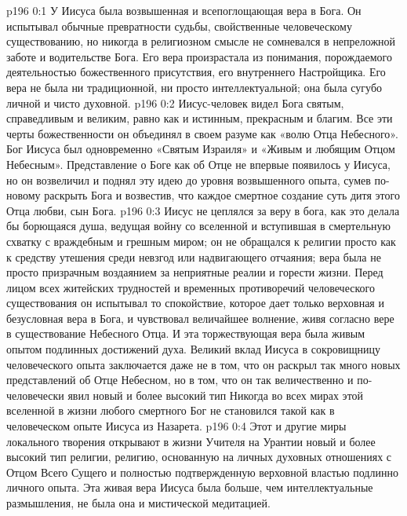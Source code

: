 \author{Комиссия срединников}
\vs p196 0:1 У Иисуса была возвышенная и всепоглощающая вера в Бога. Он испытывал обычные превратности судьбы, свойственные человеческому существованию, но никогда в религиозном смысле не сомневался в непреложной заботе и водительстве Бога. Его вера произрастала из понимания, порождаемого деятельностью божественного присутствия, его внутреннего Настройщика. Его вера не была ни традиционной, ни просто интеллектуальной; она была сугубо личной и чисто духовной.
\vs p196 0:2 Иисус\hyp{}человек видел Бога святым, справедливым и великим, равно как и истинным, прекрасным и благим. Все эти черты божественности он объединял в своем разуме как «волю Отца Небесного». Бог Иисуса был одновременно «Святым Израиля» и «Живым и любящим Отцом Небесным». Представление о Боге как об Отце не впервые появилось у Иисуса, но он возвеличил и поднял эту идею до уровня возвышенного опыта, сумев по\hyp{}новому раскрыть Бога и возвестив, что каждое смертное создание суть дитя этого Отца любви, сын Бога.
\vs p196 0:3 Иисус не цеплялся за веру в бога, как это делала бы борющаяся душа, ведущая войну со вселенной и вступившая в смертельную схватку с враждебным и грешным миром; он не обращался к религии просто как к средству утешения среди невзгод или надвигающего отчаяния; вера была не просто призрачным воздаянием за неприятные реалии и горести жизни. Перед лицом всех житейских трудностей и временных противоречий человеческого существования он испытывал то спокойствие, которое дает только верховная и безусловная вера в Бога, и чувствовал величайшее волнение, живя согласно вере в существование Небесного Отца. И эта торжествующая вера была живым опытом подлинных достижений духа. Великий вклад Иисуса в сокровищницу человеческого опыта заключается даже не в том, что он раскрыл так много новых представлений об Отце Небесном, но в том, что он так величественно и по\hyp{}человечески явил новый и более высокий тип  Никогда во всех мирах этой вселенной в жизни любого смертного Бог не становился такой  как в человеческом опыте Иисуса из Назарета.
\vs p196 0:4 Этот и другие миры локального творения открывают в жизни Учителя на Урантии новый и более высокий тип религии, религию, основанную на личных духовных отношениях с Отцом Всего Сущего и полностью подтвержденную верховной властью подлинно личного опыта. Эта живая вера Иисуса была больше, чем интеллектуальные размышления, не была она и мистической медитацией.
